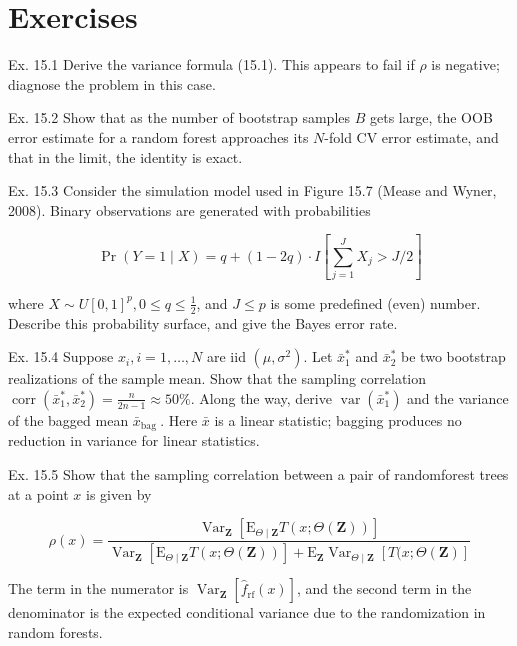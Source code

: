 \documentclass[10pt]{article}
\begin{document}
\section*{Exercises}
Ex. 15.1 Derive the variance formula (15.1). This appears to fail if $\rho$ is negative; diagnose the problem in this case.

Ex. 15.2 Show that as the number of bootstrap samples $B$ gets large, the OOB error estimate for a random forest approaches its $N$-fold CV error estimate, and that in the limit, the identity is exact.

Ex. 15.3 Consider the simulation model used in Figure 15.7 (Mease and Wyner, 2008). Binary observations are generated with probabilities


\begin{equation*}
\operatorname{Pr}(Y=1 \mid X)=q+(1-2 q) \cdot I\left[\sum_{j=1}^{J} X_{j}>J / 2\right] \tag{15.11}
\end{equation*}


where $X \sim U[0,1]^{p}, 0 \leq q \leq \frac{1}{2}$, and $J \leq p$ is some predefined (even) number. Describe this probability surface, and give the Bayes error rate.

Ex. 15.4 Suppose $x_{i}, i=1, \ldots, N$ are iid $\left(\mu, \sigma^{2}\right)$. Let $\bar{x}_{1}^{*}$ and $\bar{x}_{2}^{*}$ be two bootstrap realizations of the sample mean. Show that the sampling correlation $\operatorname{corr}\left(\bar{x}_{1}^{*}, \bar{x}_{2}^{*}\right)=\frac{n}{2 n-1} \approx 50 \%$. Along the way, derive $\operatorname{var}\left(\bar{x}_{1}^{*}\right)$ and the variance of the bagged mean $\bar{x}_{\text {bag }}$. Here $\bar{x}$ is a linear statistic; bagging produces no reduction in variance for linear statistics.

Ex. 15.5 Show that the sampling correlation between a pair of randomforest trees at a point $x$ is given by


\begin{equation*}
\rho(x)=\frac{\operatorname{Var}_{\mathbf{Z}}\left[\mathrm{E}_{\Theta \mid \mathbf{Z}} T(x ; \Theta(\mathbf{Z}))\right]}{\operatorname{Var}_{\mathbf{Z}}\left[\mathrm{E}_{\Theta \mid \mathbf{Z}} T(x ; \Theta(\mathbf{Z}))\right]+\mathrm{E}_{\mathbf{Z}} \operatorname{Var}_{\Theta \mid \mathbf{Z}}[T(x ; \Theta(\mathbf{Z})]} \tag{15.12}
\end{equation*}


The term in the numerator is $\operatorname{Var}_{\mathbf{Z}}\left[\hat{f}_{\mathrm{rf}}(x)\right]$, and the second term in the denominator is the expected conditional variance due to the randomization in random forests.
\end{document}
